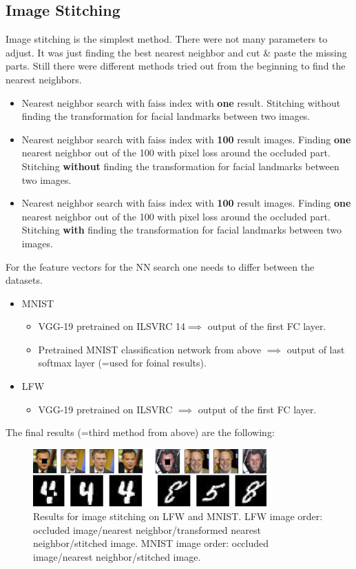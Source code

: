 \documentclass[
     11pt,         %
     a4paper,      %
     oneside,
     ]{article}
\begin{document}
\subsection{Image Stitching}
Image stitching is the simplest method. There were not many parameters to adjust. It was just finding the best nearest neighbor and cut \& paste the missing parts.
Still there were different methods tried out from the beginning to find the nearest neighbors.
\begin{itemize}
  \item Nearest neighbor search with faiss index with \textbf{one} result. Stitching without finding the transformation for facial landmarks between two images.
  \item Nearest neighbor search with faiss index with \textbf{100} result images.
  Finding \textbf{one} nearest neighbor out of the 100 with pixel loss around the occluded part. Stitching \textbf{without} finding the transformation for facial landmarks between two images.
  \item Nearest neighbor search with faiss index with \textbf{100} result images.
  Finding \textbf{one} nearest neighbor out of the 100 with pixel loss around the occluded part. Stitching \textbf{with} finding the transformation for facial landmarks between two images.
\end{itemize}
For the feature vectors for the NN search one needs to differ between the datasets.
\begin{itemize}
  \item MNIST
  \begin{itemize}
    \item VGG-19 pretrained on ILSVRC 14$\implies$ output of the first FC layer.
    \item Pretrained MNIST classification network from above $\implies$ output of last softmax layer (=used for foinal results).
  \end{itemize}
  \item LFW
  \begin{itemize}
    \item VGG-19 pretrained on ILSVRC $\implies$ output of the first FC layer.
  \end{itemize}
\end{itemize}
The final results (=third method from above) are the following:
  \begin{figure}[H]
    \begin{center}
      \includegraphics[width=0.8\textwidth]{images/stitching_final2.png}
      \caption{Results for image stitching on LFW and MNIST. LFW image order: occluded image/nearest neighbor/transformed nearest neighbor/stitched image. MNIST image order: occluded image/nearest neighbor/stitched image.}
    \end{center}
  \end{figure}
\end{document}
